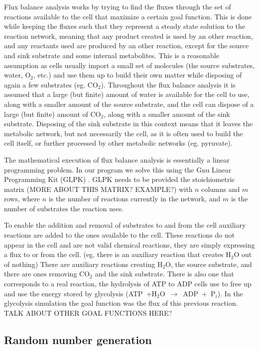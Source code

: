 \documentclass[10pt,a4paper]{article}
\begin{document}
	
	Flux balance analysis works by trying to find the fluxes through the set of reactions available to the cell that maximize a certain goal function. This is done while keeping the fluxes such that they represent a steady state solution to the reaction network, meaning that any product created is used by an other reaction, and any reactants used are produced by an other reaction, except for the source and sink substrate and some internal metabolites. This is a reasonable assumption as cells usually import a small set of molecules (the source substrates, water, O$_2$, etc.) and use them up to build their own matter while disposing of again a few substrates (eg. CO$_2$). Throughout the flux balance analysis it is assumed that a large (but finite) amount of water is available for the cell to use, along with a smaller amount of the source substrate, and the cell can dispose of a large (but finite) amount of CO$_2$, along with a smaller amount of the sink substrate. Disposing of the sink substrate in this context means that it leaves the metabolic network, but not necessarily the cell, as it is often used to build the cell itself, or further processed by other metabolic networks (eg. pyruvate).
	
	The mathematical execution of flux balance analysis is essentially a linear programming problem. In our program we solve this using the Gnu Linear Programming Kit (GLPK) \cite{glpk}. GLPK needs to be provided the stoichiometric matrix (MORE ABOUT THIS MATRIX? EXAMPLE?) with $n$ columns and $m$ rows, where $n$ is the number of reactions currently in the network, and $m$ is the number of substrates the reaction uses.  
	
	To enable the addition and removal of substrates to and from the cell auxiliary reactions are added to the ones available to the cell. These reactions do not appear in the cell and are not valid chemical reactions, they are simply expressing a flux to or from the cell. (eg. there is an auxiliary reaction that creates H$_2$O out of nothing) There are auxiliary reactions creating H$_2$O, the source substrate, and there are ones removing CO$_2$ and the sink substrate. There is also one that corresponds to a real reaction, the hydrolysis of ATP to ADP cells use to free up and use the energy stored by glycolysis (ATP~+H$_2$O~$\rightarrow$~ADP~+~P$_i$). In the glycolysis simulation the goal function was the flux of this previous reaction. 
	TALK ABOUT OTHER GOAL FUNCTIONS HERE?

\subsection{Random number generation}
\label{sub:Random number generation}
\end{document}
